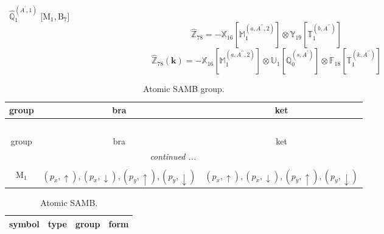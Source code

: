 \documentclass[fleqn,10pt,landscape]{article}
\begin{document}
\begin{itemize}
\vspace{4mm}
\noindent {} $\,\,\,\hat{\mathbb{Q}}_{1}^{(A^{\prime},1)}$ [M$_{1}$,\,B$_{7}$]
\begin{dmath*}
\hat{\mathbb{Z}}_{78}=- \mathbb{X}_{16}[\mathbb{M}_{1}^{(a,A^{\prime\prime},2)}] \otimes\mathbb{Y}_{19}[\mathbb{T}_{1}^{(b,A^{\prime\prime})}]
\end{dmath*}
\begin{dmath*}
\hat{\mathbb{Z}}_{78}(\bm{k})=- \mathbb{X}_{16}[\mathbb{M}_{1}^{(a,A^{\prime\prime},2)}] \otimes\mathbb{U}_{1}[\mathbb{Q}_{0}^{(s,A^{\prime})}] \otimes\mathbb{F}_{18}[\mathbb{T}_{1}^{(k,A^{\prime\prime})}]
\end{dmath*}
\begin{center}
\renewcommand{\arraystretch}{1.3}
\begin{longtable}{c|c|c}
\caption{Atomic SAMB group.}
 \\
 \hline \hline
group & bra & ket \\ \hline \endfirsthead

\multicolumn{2}{l}{\tablename\ \thetable{}} \\
 \hline \hline
group & bra & ket \\ \hline \endhead

 \hline \hline
\multicolumn{2}{r}{\footnotesize\it continued ...} \\ \endfoot

 \hline \hline
\multicolumn{2}{r}{} \\ \endlastfoot

M$_{1}$ & $(p_{x},\uparrow), (p_{x},\downarrow), (p_{y},\uparrow), (p_{y},\downarrow)$ & $(p_{x},\uparrow), (p_{x},\downarrow), (p_{y},\uparrow), (p_{y},\downarrow)$ \\
\end{longtable}
\end{center}
\begin{center}
\renewcommand{\arraystretch}{1.3}
\begin{longtable}{c|c|c|c}
\caption{Atomic SAMB.}
 \\
 \hline \hline
symbol & type & group & form \\ \hline \endfirsthead


\end{longtable}
\end{center}
\end{itemize}
\end{document}
